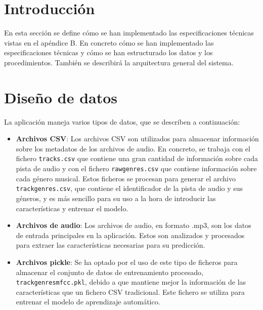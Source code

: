 
\section{Introducción}

En esta sección se define cómo se han implementado las especificaciones técnicas vistas en el apéndice B. En concreto 
cómo se han implementado las especificaciones técnicas y cómo se han estructurado los datos y los procedimientos. 
También se describirá la arquitectura general del sistema.

\section{Diseño de datos}

La aplicación maneja varios tipos de datos, que se describen a continuación:

\begin{itemize}
\tightlist

\item \textbf{Archivos CSV}: Los archivos CSV son utilizados para almacenar información sobre los metadatos de los archivos de audio.
En concreto, se trabaja con el fichero \texttt{tracks.csv} que contiene una gran cantidad de información sobre cada pista de audio y con el fichero \texttt{raw\textunderscore genres.csv} que contiene información sobre cada género musical.
Estos ficheros se procesan para generar el archivo \texttt{track\textunderscore genres.csv}, que contiene el identificador de la pista de audio y sus géneros, y es más sencillo para su uso a la hora de introducir las características y entrenar el modelo.

\item \textbf{Archivos de audio}: Los archivos de audio, en formato .mp3, son los datos de entrada principales en la aplicación. Estos son analizados y procesados para extraer las características necesarias para su predicción.

\item \textbf{Archivos pickle}: Se ha optado por el uso de este tipo de ficheros para almacenar el conjunto de datos de entrenamiento procesado, \texttt{track\textunderscore genres\textunderscore mfcc.pkl}, debido a que mantiene mejor la información de las características que un fichero CSV tradicional.
Este fichero se utiliza para entrenar el modelo de aprendizaje automático.

\end{itemize}

